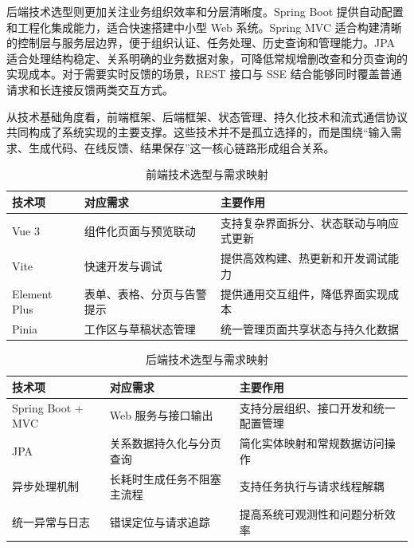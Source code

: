 后端技术选型则更加关注业务组织效率和分层清晰度。Spring Boot 提供自动配置和工程化集成能力，适合快速搭建中小型 Web 系统。Spring MVC 适合构建清晰的控制层与服务层边界，便于组织认证、任务处理、历史查询和管理能力。JPA 适合处理结构稳定、关系明确的业务数据对象，可降低常规增删改查和分页查询的实现成本。对于需要实时反馈的场景，REST 接口与 SSE 结合能够同时覆盖普通请求和长连接反馈两类交互方式。

从技术基础角度看，前端框架、后端框架、状态管理、持久化技术和流式通信协议共同构成了系统实现的主要支撑。这些技术并不是孤立选择的，而是围绕“输入需求、生成代码、在线反馈、结果保存”这一核心链路形成组合关系。

\begin{table}[htbp]
\centering
\caption{前端技术选型与需求映射}
\label{tab:chapter2-fe-mapping}
\small
\begin{tabular}{@{}p{}p{}p{}@{}}
\toprule
技术项 & 对应需求 & 主要作用 \\
\midrule
Vue 3 & 组件化页面与预览联动 & 支持复杂界面拆分、状态联动与响应式更新 \\
Vite & 快速开发与调试 & 提供高效构建、热更新和开发调试能力 \\
Element Plus & 表单、表格、分页与告警提示 & 提供通用交互组件，降低界面实现成本 \\
Pinia & 工作区与草稿状态管理 & 统一管理页面共享状态与持久化数据 \\
\bottomrule
\end{tabular}
\end{table}

\begin{table}[htbp]
\centering
\caption{后端技术选型与需求映射}
\label{tab:chapter2-be-mapping}
\small
\begin{tabular}{@{}p{}p{}p{}@{}}
\toprule
技术项 & 对应需求 & 主要作用 \\
\midrule
Spring Boot + MVC & Web 服务与接口输出 & 支持分层组织、接口开发和统一配置管理 \\
JPA & 关系数据持久化与分页查询 & 简化实体映射和常规数据访问操作 \\
异步处理机制 & 长耗时生成任务不阻塞主流程 & 支持任务执行与请求线程解耦 \\
统一异常与日志 & 错误定位与请求追踪 & 提高系统可观测性和问题分析效率 \\
\bottomrule
\end{tabular}
\end{table}

